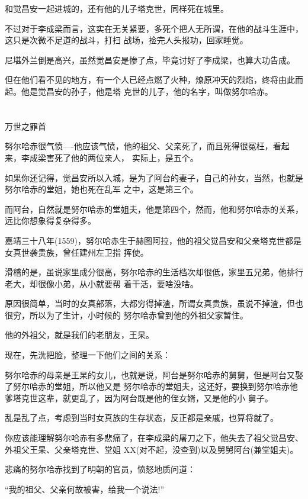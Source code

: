 \documentclass[11pt,a4paper,onecolumn]{article}
\begin{document}
和觉昌安一起进城的，还有他的儿子塔克世，同样死在城里。

不过对于李成梁而言，这实在无关紧要，多死个把人无所谓，在他的战斗生涯中，这只是次微不足道的战斗，打扫
战场，捡完人头报功，回家睡觉。

尼堪外兰倒是高兴，虽然觉昌安是惨了点，毕竟讨好了李成梁，也算大功告成。

但在他们看不见的地方，有一个人已经点燃了火种，燎原冲天的烈焰，终将由此而起。他是觉昌安的孙子，他是塔
克世的儿子，他的名字，叫做努尔哈赤。

\section[\thesection]{}

万世之罪首

努尔哈赤很气愤----他应该气愤，他的祖父、父亲死了，而且死得很冤枉，看起来，李成梁害死了他的两位亲人，
实际上，是五个。

如果你还记得，觉昌安所以入城，是为了阿台的妻子，自己的孙女，当然，也就是努尔哈赤的堂姐，她也死在乱军
之中，这是第三个。

而阿台，自然就是努尔哈赤的堂姐夫，他是第四个，然而，他和努尔哈赤的关系，远比你想象得复杂得多。

嘉靖三十八年(1559)，努尔哈赤生于赫图阿拉，他的祖父觉昌安和父亲塔克世都是女真世袭贵族，曾任建州左卫指
挥使。

滑稽的是，虽说家里成分很高，努尔哈赤的生活档次却很低，家里五兄弟，他排行老大，却很像小弟，从小就要帮
着干活，要啥没啥。

原因很简单，当时的女真部落，大都穷得掉渣，所谓女真贵族，虽说不掉渣，但也很穷，所以为了生计，小时候的
努尔哈赤曾到他的外祖父家暂住。

他的外祖父，就是我们的老朋友，王杲。

现在，先洗把脸，整理一下他们之间的关系：

努尔哈赤的母亲是王杲的女儿，也就是说，阿台是努尔哈赤的舅舅，但是阿台又娶了努尔哈赤的堂姐，所以他又是
努尔哈赤的堂姐夫，这还好，要换到努尔哈赤他爹塔克世这辈，就更乱了，因为阿台既是他的侄女婿，又是他的小
舅子。

乱是乱了点，考虑到当时女真族的生存状态，反正都是亲戚，也算将就了。

你应该能理解努尔哈赤有多悲痛了，在李成梁的屠刀之下，他失去了祖父觉昌安、外祖父王杲、父亲塔克世、堂姐
XX(对不起，没查到)以及舅舅阿台(兼堂姐夫)。

悲痛的努尔哈赤找到了明朝的官员，愤怒地质问道：

``我的祖父、父亲何故被害，给我一个说法!''
\end{document}
